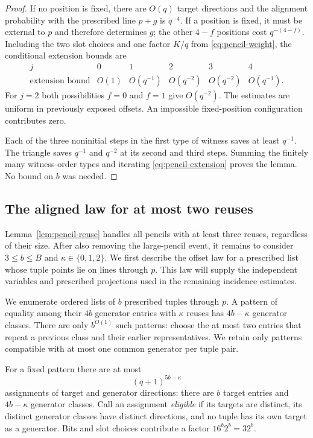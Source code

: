 \begin{proof}
If no position is fixed, there are $O(q)$ target directions and the
alignment probability with the prescribed line $p+g$ is $q^{-4}$.
If a position is fixed, it must be external to $p$ and therefore determines
$g$; the other $4-f$ positions cost $q^{-(4-f)}$.  Including the two slot
choices and one factor $K/q$ from \eqref{eq:pencil-weight}, the conditional
extension bounds are
\begin{equation}\label{eq:pencil-extension}
\begin{array}{c|ccccc}
j&0&1&2&3&4\\ \hline
\text{extension bound}&O(1)&O(q^{-1})&O(q^{-2})&O(q^{-2})&O(q^{-1}).
\end{array}
\end{equation}
For $j=2$ both possibilities $f=0$ and $f=1$ give $O(q^{-2})$.
The estimates are uniform in previously exposed offsets.  An impossible
fixed-position configuration contributes zero.

Each of the three noninitial steps in the first type of witness saves at
least $q^{-1}$.  The triangle saves $q^{-1}$ and $q^{-2}$ at its second
and third steps.  Summing the finitely many witness-order types and
iterating \eqref{eq:pencil-extension} proves the lemma.  No bound on $b$
was needed.
\end{proof}

\subsection{The aligned law for at most two reuses}

Lemma~\ref{lem:pencil-reuse} handles all pencils with at least three
reuses, regardless of their size.  After also removing the large-pencil
event, it remains to consider $3\le b\le B$ and
$\kappa\in\{0,1,2\}$.  We first describe the offset law for a prescribed
list whose tuple points lie on lines through $p$.  This law will supply
the independent variables and prescribed projections used in the
remaining incidence estimates.

We enumerate ordered lists of $b$ prescribed tuples through $p$.  A pattern
of equality among their $4b$ generator entries with $\kappa$ reuses has
$4b-\kappa$ generator classes.  There are only $b^{O(1)}$ such patterns:
choose the at most two entries that repeat a previous class and their
earlier representatives.  We retain only patterns compatible with at most
one common generator per tuple pair.

For a fixed pattern there are at most
\begin{equation}\label{eq:pencil-directions}
 (q+1)^{5b-\kappa}
\end{equation}
assignments of target and generator directions: there are $b$ target
entries and $4b-\kappa$ generator classes.  Call an assignment
\emph{eligible} if its targets are distinct, its distinct generator
classes have distinct directions, and no tuple has its own target as a
generator.  Bits and slot choices contribute a factor $16^b2^b=32^b$.

